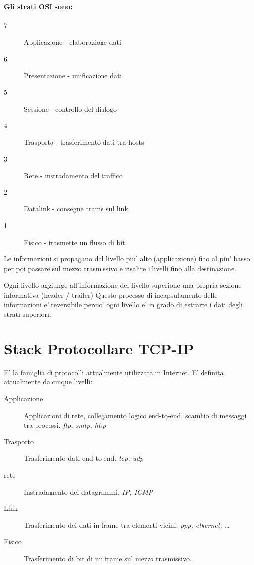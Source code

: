 \paragraph{Gli strati OSI sono:}
\begin{description}
    \item[7] Applicazione - elaborazione dati
    \item[6] Presentazione - unificazione dati 
    \item[5] Sessione - controllo del dialogo
    \item[4] Trasporto - trasferimento dati tra hosts
    \item[3] Rete - instradamento del traffico
    \item[2] Datalink - consegne trame sul link
    \item[1] Fisico - trasmette un flusso di bit
\end{description}
Le informazioni si propagano dal livello piu' alto (applicazione) fino al piu' basso per poi passare sul mezzo trasmissivo e risalire i livelli fino alla destinazione.

Ogni livello aggiunge all'informazione del livello superione una propria sezione informativa (header / trailer)
Questo processo di incapsulamento delle informazioni e' reversibile percio' ogni livello e' in grado di estrarre i dati degli strati superiori.

\section{Stack Protocollare TCP-IP}
E' la famiglia di protocolli attualmente utilizzata in Internet.
E' definita attualmente da cinque livelli:
\begin{description}
    \item[Applicazione] Applicazioni di rete, collegamento logico end-to-end, scambio di messaggi tra processi. \textit{\tiny ftp, smtp, http}
    \item[Trasporto] Trasferimento dati end-to-end. \textit{\tiny tcp, udp}
    \item[rete] Instradamento dei datagrammi. \textit{\tiny IP, ICMP}
    \item[Link] Trasferimento dei dati in frame tra elementi vicini. \textit{\tiny ppp, ethernet, \dots} 
    \item[Fisico] Trasferimento di bit di un frame sul mezzo trasmissivo. 
\end{description}